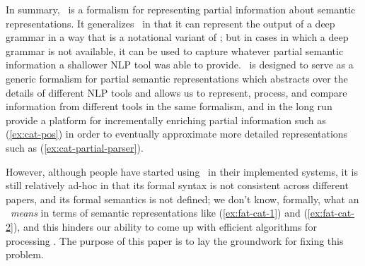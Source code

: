 In summary, \rmrs\ is a formalism for representing partial information
about semantic representations.  It generalizes \mrs\ in that it can
represent the output of a deep grammar in a way that is a notational
variant of \mrs; but in cases in which a deep grammar is not
available, it can be used to capture whatever partial semantic
information a shallower NLP tool was able to provide.  \rmrs\ is
designed to serve as a generic formalism for partial semantic
representations which abstracts over the details of different NLP
tools and allows us to represent, process, and compare information
from different tools in the same formalism, and in the long run
provide a platform for incrementally enriching partial information
such as (\ref{ex:cat-pos}) in order to eventually approximate more
detailed representations such as (\ref{ex:cat-partial-parser}).

However, although people have started using \rmrs\ in their
implemented systems, it is still relatively ad-hoc in that its formal
syntax is not consistent across different papers, and its formal
semantics is not defined; we don't know, formally, what an \rmrs\
\emph{means} in terms of semantic representations like
(\ref{ex:fat-cat-1}) and (\ref{ex:fat-cat-2}), and this hinders our
ability to come up with efficient algorithms for processing \rmrs. The
purpose of this paper is to lay the groundwork for fixing this problem.


